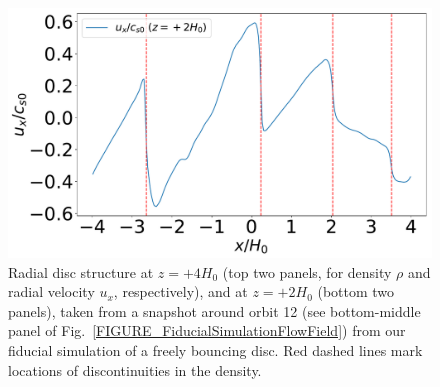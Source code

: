 \documentclass[fleqn,usenatbib]{mnras}
\begin{document}
\begin{figure}
\includegraphics[scale=0.30]{Figures/figure00PRODUCTION_VSTRHYDRORes32Re4687H6BouncezBCReflectiveLx8H_vx1_1Dverticalslice_z2H0.pdf}
\caption{Radial disc structure at $z=+4H_0$ (top two panels, for density $\rho$ and radial velocity $u_x$, respectively), and at $z=+2H_0$ (bottom two panels), taken from a snapshot around orbit 12 (see bottom-middle panel of Fig.~\ref{FIGURE_FiducialSimulationFlowField}) from our fiducial simulation of a freely bouncing disc. Red dashed lines mark locations of discontinuities in the density.}
\label{FIGURE_FiducialFreeBounceSimRadialdiscstructure}
\end{figure}
\end{document}

